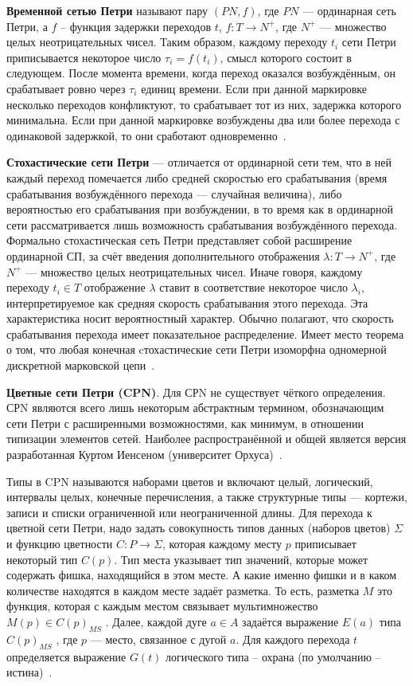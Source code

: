 \textbf{Временной сетью Петри} называют пару $(PN, f)$, где $PN$ --- ординарная сеть Петри, а $f$ – функция задержки переходов $t$, $f : T \rightarrow N^+$, где $N^+$ --- множество целых неотрицательных чисел. Таким образом, каждому переходу $t_i$ сети Петри приписывается некоторое число $\tau_i = f(t_i)$, смысл которого состоит в следующем. После момента времени, когда переход оказался возбуждённым, он срабатывает ровно через $\tau_i$  единиц времени. Если при данной маркировке несколько переходов конфликтуют, то срабатывает тот из них, задержка которого минимальна. Если при данной маркировке возбуждены два или более перехода с одинаковой задержкой, то они сработают одновременно~\cite{timed_petri}.

\textbf{Стохастические сети Петри} --- отличается от ординарной сети тем, что в ней каждый переход помечается либо средней скоростью его срабатывания (время срабатывания возбуждённого перехода --- случайная величина), либо вероятностью его срабатывания при возбуждении, в то время как в ординарной сети рассматривается лишь возможность срабатывания возбуждённого перехода. Формально стохастическая сеть Петри представляет собой расширение ординарной СП, за счёт введения дополнительного отображения $\lambda : T \rightarrow N^+$, где $N^+$ --- множество целых неотрицательных чисел. Иначе говоря, каждому переходу $t_i \in T$ отображение $\lambda$ ставит в соответствие некоторое число $\lambda_i$, интерпретируемое как средняя скорость срабатывания этого перехода. Эта характеристика носит вероятностный характер. Обычно полагают, что скорость срабатывания перехода имеет показательное распределение. Имеет место теорема о том, что любая конечная cтохастические сети Петри изоморфна одномерной дискретной марковской цепи~\cite{timed_petri}.

\textbf{Цветные сети Петри (CPN)}. Для СРN не существует чёткого определения. СРN являются всего лишь некоторым абстрактным термином, обозначающим сети Петри с расширенными возможностями, как минимум, в отношении типизации элементов сетей. Наиболее распространённой и общей является версия разработанная Куртом Иенсеном (университет Орхуса)~\cite{cpnNoForm}. 

Типы в CPN называются наборами цветов и включают целый, логический, интервалы целых, конечные перечисления, а также структурные типы --- кортежи, записи и списки ограниченной или неограниченной длины. Для перехода к цветной сети Петри, надо задать совокупность типов данных (наборов цветов) $\Sigma$ и функцию цветности $C :P \rightarrow \Sigma$, которая каждому месту $p$ приписывает некоторый тип $C(p)$. Тип места указывает тип значений, которые может содержать фишка, находящийся в этом месте. А какие именно фишки и в каком количестве находятся в каждом месте задаёт разметка. То есть, разметка $M$ это функция, которая с каждым местом связывает мультимножество $M(p) \in C(p)_{MS}$ . Далее, каждой дуге $a \in A$ задаётся выражение $E(a)$ типа $C(p)_{MS}$ , где $p$ — место, связанное с дугой $a$. Для каждого перехода $t$ определяется выражение $G(t)$ логического типа -- охрана (по умолчанию -- истина)~\cite{cpn}.

